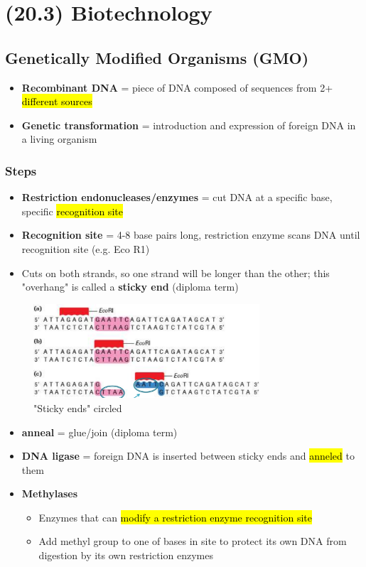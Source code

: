 \documentclass[a4paper,12pt]{article}
\begin{document}
\section{(20.3) Biotechnology}

\subsection{Genetically Modified Organisms (GMO)}
\begin{itemize}
    \item{\textbf{Recombinant DNA} = piece of DNA composed of sequences from 2+ \hl{different sources}}
    \item{\textbf{Genetic transformation} = introduction and expression of foreign DNA in a living organism}
\end{itemize}

\subsubsection{Steps}
\begin{itemize}
    \item{\textbf{Restriction endonucleases/enzymes} = cut DNA at a specific base, specific \hl{recognition site}}
    \item{\textbf{Recognition site} = 4-8 base pairs long, restriction enzyme scans DNA until recognition site (e.g. Eco R1)}
    \item{Cuts on both strands, so one strand will be longer than the other; this "overhang" is called a \textbf{sticky end} (diploma term)}
\end{itemize}

\begin{figure}[H]
    \centering
    \includegraphics[width=0.75\textwidth]{rest}
    \caption{"Sticky ends" circled}
\end{figure}

\begin{itemize}
    \item{\textbf{anneal} = glue/join (diploma term)}
    \item{\textbf{DNA ligase} = foreign DNA is inserted between sticky ends and \hl{anneled} to them}
    \item{
            \textbf{Methylases}
            \begin{itemize}
                \item{Enzymes that can \hl{modify a restriction enzyme recognition site}}
                \item{Add methyl group to one of bases in site to protect its own DNA from digestion by its own restriction enzymes}
            \end{itemize}
        }
\end{itemize}
\end{document}
